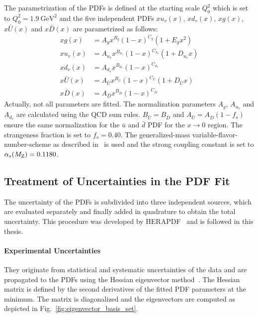 The parametrization of the PDFs is defined at the starting scale
$Q_0^2$ which is set to $Q_0^2 = \SI{1.9}{\GeV \squared}$ and the five
independent PDFs $xu_v(x)$, $xd_v(x)$, $xg(x)$, $x\bar{U}(x)$ and $x\bar{D}(x)$
are parametrized as follows:
%
\begin{align*}
  xg(x) &= A_g x^{B_g} (1-x)^{C_g} (1 + E_g x^2)\\
  xu_v(x) &= A_{u_{v}} x^{B_{u_{v}}} (1-x)^{C_{u_{v}}}(1 + D_{u_{v}}x)\\
  xd_v(x) &= A_{d_v} x^{B_{d_v}} (1-x)^{C_{d_{v}}}\\
  x\bar U(x) &= A_{\bar U} x^{B_{\bar U}} (1-x)^{C_{\bar U}}(1 + D_{\bar U}x)\\
  x\bar D(x) &= A_{\bar D} x^{B_{\bar D}} (1-x)^{C_{\bar D}}
\end{align*}
%
Actually, not all parameters are fitted. The normalization parameters $A_g$,
$A_{u_{v}}$ and $A_{d_{v}}$ are calculated using the QCD sum rules. $B_{\bar
U}=B_{\bar D}$ and $A_{\bar U} = A_{\bar D}(1-f_s)$ ensure the same
normalization for the $\bar u$ and $\bar d$ PDF for the $x \rightarrow 0$
region. The strangeness fraction is set to $f_s = 0.40$. The generalized-mass
variable-flavor-number-scheme as described in~\cite{Thorne:1997ga,Thorne:2006qt}
is used and the strong coupling constant is set to $\alpha_{s}(M_\mathrm{Z})= 0.1180$.


\subsection{Treatment of Uncertainties in the PDF Fit}
\label{section:treatment_pdf_uncertainties}

The uncertainty of the PDFs is subdivided into three independent sources, which
are evaluated separately and finally added in quadrature to obtain the total
uncertainty. This procedure was developed by HERAPDF~\cite{Abramowicz:2015mha}
and is followed in this thesis.

\paragraph{Experimental Uncertainties} 
They originate from statistical and systematic uncertainties of the data
and are propagated to the PDFs using the Hessian eigenvector
method~\cite{Pumplin:2001ct}. The Hessian matrix is defined by the second
derivatives of the fitted PDF parameters at the \chisq minimum. The matrix is
diagonalized and the eigenvectors are computed as depicted in
Fig.~\ref{fig:eigenvector_basis_set}. 


